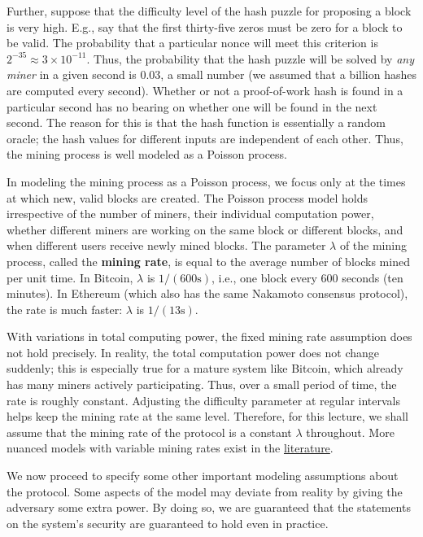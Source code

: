 \documentclass{article}
\begin{document}
Further, suppose that the difficulty level of the hash puzzle for proposing a block is very high. E.g., say that the first thirty-five zeros must be zero for a block to be valid. The probability that a particular nonce will meet this criterion is $2^{-35} \approx 3 \times 10^{-11}$. Thus, the probability that the hash puzzle will be solved by \textit{any miner} in a given second is $0.03$, a small number (we assumed that a billion hashes are computed every second). Whether or not a proof-of-work hash is found in a particular second has no bearing on whether one will be found in the next second. The reason for this is that the hash function is essentially a random oracle; the hash values for different inputs are independent of each other. Thus, the mining process is well modeled as a Poisson process.

In modeling the mining process as a Poisson process, we focus only at the times at which new, valid blocks are created. The Poisson process model holds irrespective of the number of miners, their individual computation power, whether different miners are working on the same block or different blocks, and when different users receive newly mined blocks. The parameter $\lambda$ of the mining process, called the \textbf{mining rate}, is equal to the average number of blocks mined per unit time. In Bitcoin, $\lambda$ is $1/(600 \text{s})$, i.e., one block every 600 seconds (ten minutes). In Ethereum (which also has the same Nakamoto consensus protocol), the rate is much faster: $\lambda$ is $1/(13 \text{s})$.

With variations in total computing power, the fixed mining rate assumption does not hold precisely. In reality, the total computation power does not change suddenly; this is especially true for a mature system like Bitcoin, which already has many miners actively participating. Thus, over a small period of time, the rate is roughly constant. Adjusting the difficulty parameter at regular intervals helps keep the mining rate at the same level. Therefore, for this lecture, we shall assume that the mining rate of the protocol is a constant $\lambda$ throughout. More nuanced models with variable mining rates exist in the \href{https://eprint.iacr.org/2016/1048.pdf}{literature}. %

We now proceed to specify some other important modeling assumptions about the protocol. Some aspects of the model may deviate from reality by giving the adversary some extra power. By doing so, we are guaranteed that the statements on the system's security are guaranteed to hold even in practice.
\end{document}
